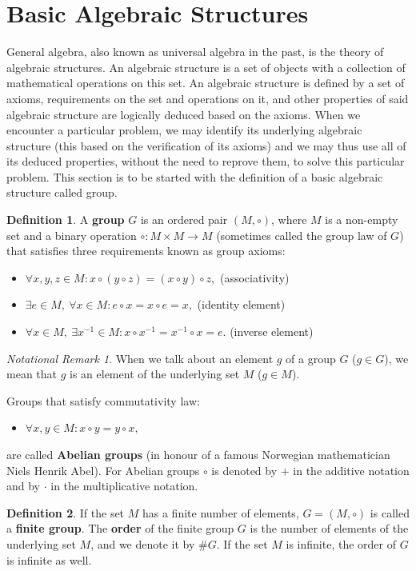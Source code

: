\documentclass[thesis=M,english]{FITthesis}[2012/10/20]
\theoremstyle{remark}
\newtheorem*{NRM}{Notational Remark}
\theoremstyle{definition}
\newtheorem{DF}{Definition}[section]
\begin{document}
\section{Basic Algebraic Structures}
General algebra, also known as universal algebra in the past, is the theory of algebraic structures. An algebraic structure is a set of objects with a collection of mathematical operations on this set.  An algebraic structure is defined by a set of axioms, requirements on the set and operations on it, and other properties of said algebraic structure are logically deduced based on the axioms. When we encounter a particular problem, we may identify its underlying algebraic structure (this based on the verification of its axioms) and we may thus use all of its deduced properties, without the need to reprove them, to solve this particular problem. This section is to be started with the definition of a basic algebraic structure called group.
\begin{DF}
A \textbf{group} $G$ is an ordered pair $(M,  \circ)$, where $M$ is a non-empty set and a binary operation $\circ : M \times M \to M $ (sometimes called the group law of $G$) that satisfies three requirements known as group axioms: 
\end{DF}
\begin{itemize}
\item 
$ \forall x,y,z \in M: x\circ (y \circ z) = (x \circ y) \circ z,$ \hfill (associativity)
\item 
$ \exists e \in M,\ \forall x \in M: e \circ x = x \circ e = x,$ \hfill (identity element)
\item 
$\forall x \in M,\ \exists x^{-1} \in M: x \circ x^{-1} = x^{-1} \circ x = e.$ \hfill (inverse element)
\end{itemize}
\begin{NRM}
When we talk about an element $g$ of a group $G$ ($g \in G$), we mean that $g$ is an element of the underlying set $M$ ($g \in M$).
\end{NRM}
Groups that satisfy commutativity law:
\begin{itemize}
\item 
$ \forall x, y\in M: x \circ y = y \circ x,$
\end{itemize}
are called \textbf{Abelian groups} (in honour of a famous Norwegian mathematician Niels Henrik Abel). For Abelian groups $\circ$ is denoted by $+$ in the additive notation and by $\cdot$ in the multiplicative notation.
\begin{DF}
If the set $M$ has a finite number of elements, $G = (M, \circ)$ is called a \textbf{finite group}. The \textbf{order} of the finite group $G$ is the number of elements of the underlying set $M$, and we denote it by $\#G$. If the set $M$ is infinite, the order of $G$ is infinite as well.
\end{DF}
\end{document}
